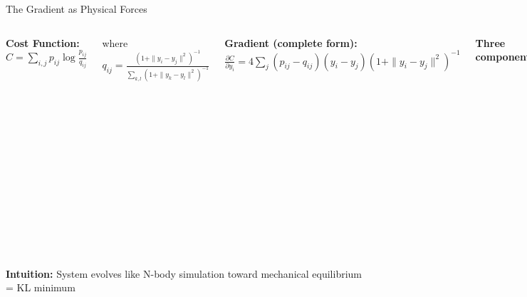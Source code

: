 \documentclass[aspectratio=169]{beamer}
\newcommand{\intuition}[1]{\colorbox{green!10}{\textcolor{intuitioncolor}{\textbf{Intuition:} #1}}}
\begin{document}
\begin{frame}{The Gradient as Physical Forces}
\begin{columns}
\textbf{Cost Function:}
$C = \sum_{i,j} p_{ij} \log\frac{p_{ij}}{q_{ij}}$

where $q_{ij} = \frac{(1 + \|y_i - y_j\|^2)^{-1}}{\sum_{k,l} (1 + \|y_k - y_l\|^2)^{-1}}$

\vspace{0.3cm}
\textbf{Gradient (complete form):}
$\frac{\partial C}{\partial y_i} = 4\sum_j (p_{ij} - q_{ij})(y_i - y_j)(1 + \|y_i - y_j\|^2)^{-1}$

\vspace{0.3cm}
\textbf{Three components:}
\begin{itemize}
\item $(p_{ij} - q_{ij})$: error signal
\item $(y_i - y_j)$: direction
\item $(1 + d_{ij}^2)^{-1}$: adaptive weight
\end{itemize}


\vspace{0.2cm}
\textbf{Physical Interpretation:}
\begin{itemize}
\item Green: Pull neighbors together
\item Red: Push non-neighbors apart
\item Force $\propto$ $(1+d^2)^{-1}$: weakens with distance
\end{itemize}
\end{columns}

\vspace{0.3cm}
\intuition{System evolves like N-body simulation toward mechanical equilibrium = KL minimum}
\end{frame}
\end{document}
